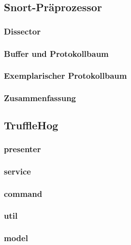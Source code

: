 \documentclass[18pt]{beamer}
\begin{document}
\iffalse
\subsection{Snort-Präprozessor}
	\subsubsection{Dissector}
		
		
		
		
		
		
		
	\subsubsection{Buffer und Protokollbaum}
		
	\subsubsection{Exemplarischer Protokollbaum}
		
	\subsubsection{Zusammenfassung}
		

\subsection{TruffleHog}
	
	\subsubsection{presenter}
		
	\subsubsection{service}
		
	\subsubsection{command}
		
	\subsubsection{util}
		
	\subsubsection{model}
		
\end{document}
